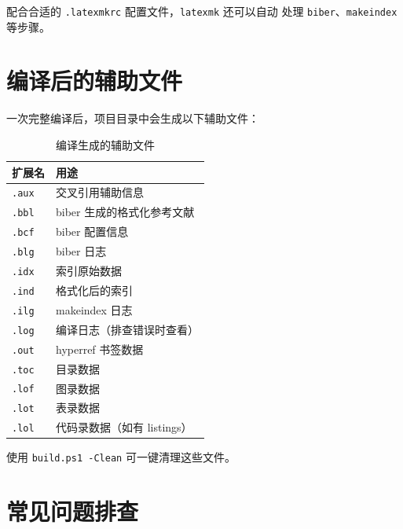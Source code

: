 配合合适的 \texttt{.latexmkrc} 配置文件，\texttt{latexmk} 还可以自动
处理 \texttt{biber}、\texttt{makeindex} 等步骤。


\section{编译后的辅助文件}

一次完整编译后，项目目录中会生成以下辅助文件：

\begin{table}[h]
\centering
\caption{编译生成的辅助文件}
\begin{tabular}{@{}ll@{}}
\toprule
扩展名 & 用途 \\
\midrule
\texttt{.aux}  & 交叉引用辅助信息 \\
\texttt{.bbl}  & biber 生成的格式化参考文献 \\
\texttt{.bcf}  & biber 配置信息 \\
\texttt{.blg}  & biber 日志 \\
\texttt{.idx}  & 索引原始数据 \\
\texttt{.ind}  & 格式化后的索引 \\
\texttt{.ilg}  & makeindex 日志 \\
\texttt{.log}  & 编译日志（排查错误时查看） \\
\texttt{.out}  & hyperref 书签数据 \\
\texttt{.toc}  & 目录数据 \\
\texttt{.lof}  & 图录数据 \\
\texttt{.lot}  & 表录数据 \\
\texttt{.lol}  & 代码录数据（如有 listings）\\
\bottomrule
\end{tabular}
\end{table}

使用 \texttt{build.ps1 -Clean} 可一键清理这些文件。


\section{常见问题排查}


